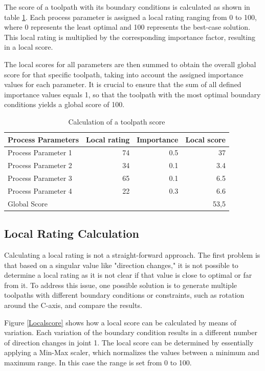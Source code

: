 The score of a toolpath with its boundary conditions is calculated as shown in table \ref{weighting}. Each process parameter is assigned a local rating ranging from 0 to 100, where 0 represents the least optimal and 100 represents the best-case solution. This local rating is multiplied by the corresponding importance factor, resulting in a local score.

The local scores for all parameters are then summed to obtain the overall global score for that specific toolpath, taking into account the assigned importance values for each parameter. It is crucial to ensure that the sum of all defined importance values equals 1, so that the toolpath with the most optimal boundary conditions yields a global score of 100.

\begin{table}[H]
	\centering
	\begin{tabular}{||l|r|r|r||}
		Process Parameters & Local rating & Importance & Local score\\
		\hline
		\hline
		\hline
		
		Process Parameter 1 & 74 & 0.5 & 37\\
		Process Parameter 2 & 34& 0.1&3.4\\
		Process Parameter 3& 65& 0.1&6.5\\
		Process Parameter 4& 22&0.3&6.6\\
		\hline
		\hline
		\hline
		Global Score& & &53,5\\
		\hline
		\hline
	\end{tabular}
	
	\caption{Calculation of a toolpath score}
	\label{weighting}
\end{table}


\subsection{Local Rating Calculation}\label{LRC}
Calculating a local rating is not a straight-forward approach. The first problem is that based on a singular value like "direction changes," it is not possible to determine a local rating as it is not clear if that value is close to optimal or far from it.
To address this issue, one possible solution is to generate multiple toolpaths with different boundary conditions or constraints, such as rotation around the C-axis, and compare the results.

Figure \ref{Localscore} shows how a local score can be calculated by means of variation. Each variation  of the boundary condition results in a different number of direction changes in joint 1. The local score can be determined by essentially applying a Min-Max scaler, which normalizes the values between a minimum and maximum range. In this case the range is set from 0 to 100.

